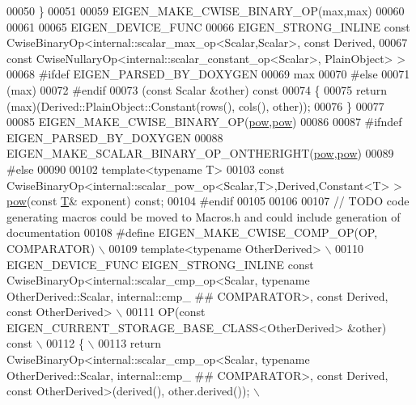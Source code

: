 \begin{DoxyCode}
00050 \}
00051 
00059 EIGEN\_MAKE\_CWISE\_BINARY\_OP(max,max)
00060 
00061 
00065 EIGEN\_DEVICE\_FUNC
00066 EIGEN\_STRONG\_INLINE \textcolor{keyword}{const} CwiseBinaryOp<internal::scalar\_max\_op<Scalar,Scalar>, \textcolor{keyword}{const} Derived,
00067                                         \textcolor{keyword}{const} CwiseNullaryOp<internal::scalar\_constant\_op<Scalar>, 
      PlainObject> >
00068 \textcolor{preprocessor}{#ifdef EIGEN\_PARSED\_BY\_DOXYGEN}
00069 max
00070 \textcolor{preprocessor}{#else}
00071 (max)
00072 #endif
00073 (\textcolor{keyword}{const} Scalar &other)\textcolor{keyword}{ const}
00074 \textcolor{keyword}{}\{
00075   \textcolor{keywordflow}{return} (max)(Derived::PlainObject::Constant(rows(), cols(), other));
00076 \}
00077 
00085 EIGEN\_MAKE\_CWISE\_BINARY\_OP(\hyperlink{group___core___module_ab6dc101d82e8228a19a8840e3a29c1c9}{pow},\hyperlink{group___core___module_ab6dc101d82e8228a19a8840e3a29c1c9}{pow})
00086 
00087 \textcolor{preprocessor}{#ifndef EIGEN\_PARSED\_BY\_DOXYGEN}
00088 EIGEN\_MAKE\_SCALAR\_BINARY\_OP\_ONTHERIGHT(\hyperlink{group___core___module_ab6dc101d82e8228a19a8840e3a29c1c9}{pow},\hyperlink{group___core___module_ab6dc101d82e8228a19a8840e3a29c1c9}{pow})
00089 \textcolor{preprocessor}{#else}
00090 
00102 \textcolor{keyword}{template}<\textcolor{keyword}{typename} T>
00103 \textcolor{keyword}{const} CwiseBinaryOp<internal::scalar\_pow\_op<Scalar,T>,Derived,Constant<T> > \hyperlink{group___core___module_ab6dc101d82e8228a19a8840e3a29c1c9}{pow}(\textcolor{keyword}{const} 
      \hyperlink{group___sparse_core___module_class_eigen_1_1_triplet}{T}& exponent) \textcolor{keyword}{const};
00104 \textcolor{preprocessor}{#endif}
00105 
00106 
00107 \textcolor{comment}{// TODO code generating macros could be moved to Macros.h and could include generation of documentation}
00108 \textcolor{preprocessor}{#define EIGEN\_MAKE\_CWISE\_COMP\_OP(OP, COMPARATOR) \(\backslash\)}
00109 \textcolor{preprocessor}{template<typename OtherDerived> \(\backslash\)}
00110 \textcolor{preprocessor}{EIGEN\_DEVICE\_FUNC EIGEN\_STRONG\_INLINE const CwiseBinaryOp<internal::scalar\_cmp\_op<Scalar, typename
       OtherDerived::Scalar, internal::cmp\_ ## COMPARATOR>, const Derived, const OtherDerived> \(\backslash\)}
00111 \textcolor{preprocessor}{OP(const EIGEN\_CURRENT\_STORAGE\_BASE\_CLASS<OtherDerived> &other) const \(\backslash\)}
00112 \textcolor{preprocessor}{\{ \(\backslash\)}
00113 \textcolor{preprocessor}{  return CwiseBinaryOp<internal::scalar\_cmp\_op<Scalar, typename OtherDerived::Scalar, internal::cmp\_ ##
       COMPARATOR>, const Derived, const OtherDerived>(derived(), other.derived()); \(\backslash\)}

\end{DoxyCode}
